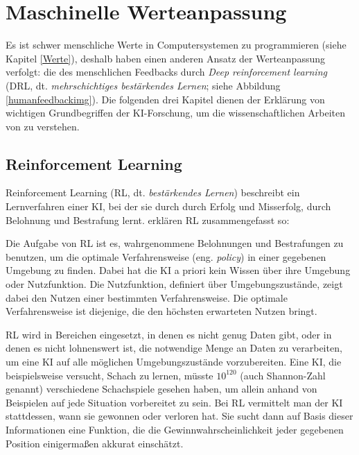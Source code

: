 \chapter{Maschinelle Werteanpassung}

Es ist schwer menschliche Werte in Computersystemen zu programmieren (siehe Kapitel \ref{Werte}), deshalb haben \citeauthor{irving_ai_2018} einen anderen Ansatz der Werteanpassung verfolgt: die des menschlichen Feedbacks durch \emph{Deep reinforcement learning} (DRL, dt. \emph{mehrschichtiges bestärkendes Lernen}; siehe Abbildung \ref{humanfeedbackimg}). Die folgenden drei Kapitel dienen der Erklärung von wichtigen Grundbegriffen der KI-Forschung, um die wissenschaftlichen Arbeiten von \citeauthor{irving_ai_2018} zu verstehen.

\section{Reinforcement Learning}
Reinforcement Learning (RL, dt. \emph{bestärkendes Lernen}) beschreibt ein Lernverfahren einer KI, bei der sie durch durch Erfolg und Misserfolg, durch Belohnung und Bestrafung lernt. \citeauthor{russell_artificial_2016} erklären RL zusammengefasst so: 

Die Aufgabe von RL ist es, wahrgenommene Belohnungen und Bestrafungen zu benutzen, um die optimale Verfahrensweise (eng. \emph{policy}) in einer gegebenen Umgebung zu finden. Dabei hat die KI a priori kein Wissen über ihre Umgebung oder Nutzfunktion. Die Nutzfunktion, definiert über Umgebungszustände, zeigt dabei den Nutzen einer bestimmten Verfahrensweise. Die optimale Verfahrensweise ist diejenige, die den höchsten erwarteten Nutzen bringt.

RL wird in Bereichen eingesetzt, in denen es nicht genug Daten gibt, oder in denen es nicht lohnenswert ist, die notwendige Menge an Daten zu verarbeiten, um eine KI auf alle möglichen Umgebungszustände vorzubereiten. Eine KI, die beispielsweise versucht, Schach zu lernen, müsste $10^{120}$ (auch Shannon-Zahl genannt) verschiedene Schachspiele gesehen haben, um allein anhand von Beispielen auf jede Situation vorbereitet zu sein.  Bei RL vermittelt man der KI stattdessen, wann sie gewonnen oder verloren hat. Sie sucht dann auf Basis dieser Informationen eine Funktion, die die Gewinnwahrscheinlichkeit jeder gegebenen Position einigermaßen akkurat einschätzt.

